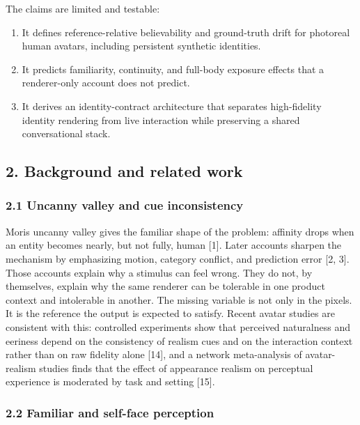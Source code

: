 \documentclass[
]{article}
\providecommand{\tightlist}{%
  \setlength{\itemsep}{0pt}\setlength{\parskip}{0pt}}
\begin{document}
The claims are limited and testable:

\begin{enumerate}
\def\labelenumi{\arabic{enumi}.}
\tightlist
\item
  It defines reference-relative believability and ground-truth drift for
  photoreal human avatars, including persistent synthetic identities.
\item
  It predicts familiarity, continuity, and full-body exposure effects
  that a renderer-only account does not predict.
\item
  It derives an identity-contract architecture that separates
  high-fidelity identity rendering from live interaction while
  preserving a shared conversational stack.
\end{enumerate}

\subsection{2. Background and related
work}\label{2-background-and-related-work}

\subsubsection{2.1 Uncanny valley and cue
inconsistency}\label{21-uncanny-valley-and-cue-inconsistency}

Mori\textquotesingle s uncanny valley gives the familiar shape of the
problem: affinity drops when an entity becomes nearly, but not fully,
human {[}1{]}. Later accounts sharpen the mechanism by emphasizing
motion, category conflict, and prediction error {[}2, 3{]}. Those
accounts explain why a stimulus can feel wrong. They do not, by
themselves, explain why the same renderer can be tolerable in one
product context and intolerable in another. The missing variable is not
only in the pixels. It is the reference the output is expected to
satisfy. Recent avatar studies are consistent with this: controlled
experiments show that perceived naturalness and eeriness depend on the
consistency of realism cues and on the interaction context rather than
on raw fidelity alone {[}14{]}, and a network meta-analysis of
avatar-realism studies finds that the effect of appearance realism on
perceptual experience is moderated by task and setting {[}15{]}.

\subsubsection{2.2 Familiar and self-face
perception}\label{22-familiar-and-self-face-perception}
\end{document}
